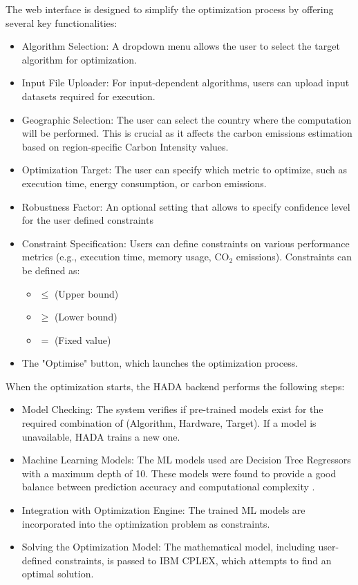 \documentclass[a4paper,singleside,12pt]{report} %
\begin{document}
The web interface is designed to simplify the optimization process by offering several key functionalities:
\begin{itemize}
    \item Algorithm Selection: A dropdown menu allows the user to select the target algorithm for optimization.
    \item Input File Uploader: For input-dependent algorithms, users can upload input datasets required for execution.
    \item Geographic Selection: The user can select the country where the computation will be performed. This is crucial as it affects the carbon emissions estimation based on region-specific Carbon Intensity values.
    \item Optimization Target: The user can specify which metric to optimize, such as execution time, energy consumption, or carbon emissions.
    \item Robustness Factor: An optional setting that allows to specify confidence level for the user defined constraints
    \item Constraint Specification: Users can define constraints on various performance metrics (e.g., execution time, memory usage, CO$_2$ emissions). Constraints can be defined as:
    \begin{itemize}
        \item $\leq$ (Upper bound) 
        \item $\geq$ (Lower bound)
        \item $=$ (Fixed value)
    \end{itemize} 
    \item The "Optimise" button, which launches the optimization process.
\end{itemize}

When the optimization starts, the HADA backend performs the following steps:
\begin{itemize}
    \item Model Checking: The system verifies if pre-trained models exist for the required combination of (Algorithm, Hardware, Target). If a model is unavailable, HADA trains a new one.
    \item Machine Learning Models: The ML models used are Decision Tree Regressors with a maximum depth of 10. These models were found to provide a good balance between prediction accuracy and computational complexity \cite{DEFILIPPO2022109199}.
    \item Integration with Optimization Engine: The trained ML models are incorporated into the optimization problem as constraints.
    \item Solving the Optimization Model: The mathematical model, including user-defined constraints, is passed to IBM CPLEX, which attempts to find an optimal solution.
\end{itemize}
\end{document}

